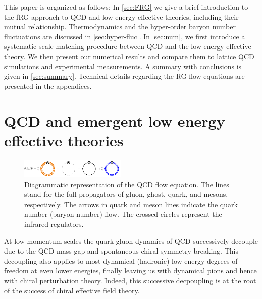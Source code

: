 \documentclass[%
reprint,
superscriptaddress,
showpacs,preprintnumbers,
amsmath,amssymb,
aps,
prd,
]{revtex4-1}
\begin{document}
This paper is organized as follows: In \autoref{sec:FRG} we give a brief introduction to the fRG approach to QCD and low energy effective theories, including their mutual relationship. Thermodynamics and the hyper-order baryon number fluctuations are discussed in \autoref{sec:hyper-fluc}. In \autoref{sec:num}, we first introduce a systematic scale-matching procedure between QCD and the low energy effective theory. We then present our numerical results and compare them to lattice QCD simulations and experimental measurements. A summary with conclusions is given in \autoref{sec:summary}. Technical details regarding the RG flow equations are presented in the appendices.
	
	
	
	
	
\section{QCD and emergent low energy effective theories}
\label{sec:FRG}
	
%
\begin{figure}[t]
\includegraphics[width=0.45\textwidth]{QCD_equation}
\caption{Diagrammatic representation of the QCD flow equation. The lines stand for the full propagators of gluon, ghost, quark, and mesons, respectively. The arrows in quark and meson lines indicate the quark number (baryon number) flow. The crossed circles represent the infrared regulators.}\label{fig:QCD_equation}
\end{figure}
%
	
At low momentum scales the quark-gluon dynamics of QCD successively decouple due to the QCD mass gap and spontaneous chiral symmetry breaking. This decoupling also applies to most dynamical (hadronic) low energy degrees of freedom at even lower energies, finally leaving us with dynamical pions and hence with chiral perturbation theory. Indeed, this successive decpoupling is at the root of the success of chiral effective field theory. 
	
\end{document}
